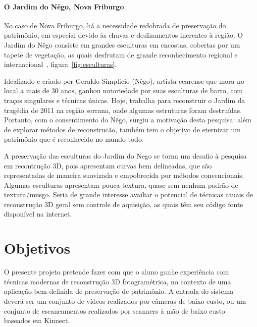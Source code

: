 \paragraph{O Jardim do Nêgo, Nova Friburgo}
No caso de Nova Friburgo, há a necessidade redobrada de preservação do
patrimônio, em especial devido às chuvas e deslizamentos inerentes à região.  O
Jardim do Nêgo consiste em grandes esculturas em encostas, cobertas por um tapete de
vegetação, as quais desfrutam de grande reconhecimento regional e internacional~\cite{JardimDoNego:TheGuardian},
figura~\ref{fig:esculturas}.


Idealizado e criado por Geraldo Simplicio (Nêgo), artista cearense que mora no 
local a mais de 30 anos, ganhou notoriedade por suas esculturas de barro, com traços 
singulares e técnicas únicas. Hoje, trabalha para reconstruir o Jardim da tragédia de 
2011 na região serrana, onde algumas estruturas foram destruídas. Portanto, com o 
consentimento do Nêgo, surgiu a motivação desta pesquisa: além de explorar métodos de 
reconstrucão, também tem o objetivo de eternizar um patrimônio que é reconhecido no mundo
todo.

A preservação das esculturas do Jardim do Nego se torna um desafio à pesquisa em
recontrução 3D, pois apresentam curvas bem delineadas, que são 
representadas de maneira suavizada e empobrecida por métodos convencionais.
Algumas esculturas apresentam pouca textura, quase sem nenhum padrão de textura/musgo.
Seria de grande interesse availiar o potencial de técnicas atuais de
reconstrução 3D geral sem controle de aquisição, as quais têm seu código fonte
disponível na internet.

\section{Objetivos}

O presente projeto pretende fazer com que o aluno ganhe experiência com técnicas
modernas de reconstrução 3D fotogramétrica, no contexto de uma aplicação
bem-definida de preservação de patrimônio. A entrada do sistema deverá ser um
conjunto de vídeos realizados por câmeras de baixo custo, ou um conjunto de
escaneamentos realizados por scanners à mão de baixo custo baseados em Kinnect.


